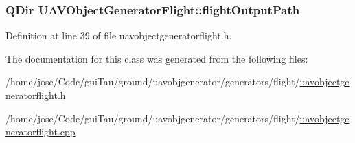 \hypertarget{class_u_a_v_object_generator_flight_af61153c1d0b35847a5e9133952b215cc}{
\subsubsection[{flight\-Output\-Path}]{\setlength{\rightskip}{0pt plus 5cm}Q\-Dir U\-A\-V\-Object\-Generator\-Flight\-::flight\-Output\-Path}}\label{class_u_a_v_object_generator_flight_af61153c1d0b35847a5e9133952b215cc}


Definition at line 39 of file uavobjectgeneratorflight.\-h.



The documentation for this class was generated from the following files\-:\begin{DoxyCompactItemize}
\item 
/home/jose/\-Code/gui\-Tau/ground/uavobjgenerator/generators/flight/\hyperlink{uavobjectgeneratorflight_8h}{uavobjectgeneratorflight.\-h}\item 
/home/jose/\-Code/gui\-Tau/ground/uavobjgenerator/generators/flight/\hyperlink{uavobjectgeneratorflight_8cpp}{uavobjectgeneratorflight.\-cpp}\end{DoxyCompactItemize}
